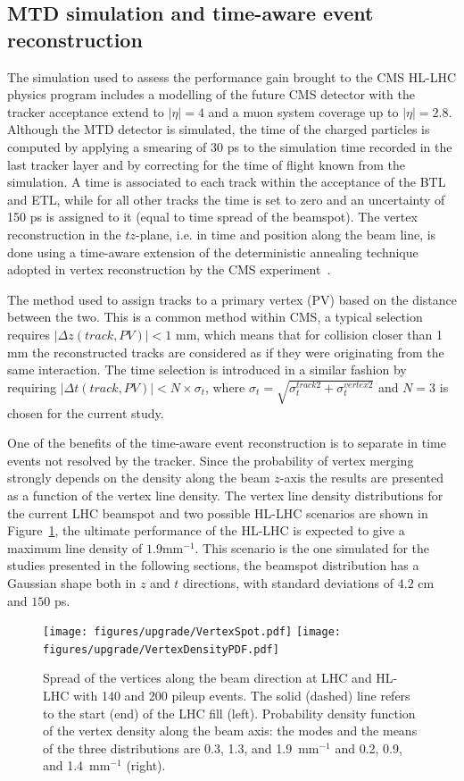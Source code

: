 \subsection{MTD simulation and time-aware event reconstruction}
The simulation used to assess the performance gain brought to the CMS HL-LHC physics program
includes a modelling of the future CMS detector with the tracker acceptance extend to $|\eta|=4$ and
a muon system coverage up to $|\eta|=2.8$. 
Although the MTD detector is simulated, the time of the charged particles
is computed by applying a smearing of 30 ps to the simulation time recorded in the last tracker layer and by
correcting for the time of flight known from the simulation. A time is associated to each track within the acceptance of the BTL
and ETL, while for all other tracks the time is set to zero and an uncertainty of 150 ps is assigned to it (equal to time
spread of the beamspot).
The vertex reconstruction in the $tz$-plane, i.e. in time and position along the
beam line, is done using a time-aware extension of the deterministic
annealing technique adopted in vertex reconstruction by the CMS experiment~\cite{Chatrchyan:2014fea}.

The method used to assign tracks to a primary vertex (PV) based on the distance between the two. This is a common
method within CMS, a typical selection 
requires $|\Delta z(track, PV)| < 1$ mm, which means that for collision closer than 1 mm the reconstructed tracks are
considered as if they were originating from the same interaction. The time selection is introduced in a similar
fashion by requiring $|\Delta t(track, PV)| < N\times\sigma_t$, where $\sigma_t = \sqrt{\sigma_t^{track 2}+\sigma_t^{vertex 2}}$
and $N=3$ is chosen for the current study.

One of the benefits of the time-aware event reconstruction is to separate in time events not resolved by
the tracker. Since the probability of vertex merging strongly depends on the density along the beam $z$-axis the
results are presented as a function of the vertex line density.
The vertex line density distributions for the current LHC beamspot and
two possible HL-LHC scenarios are shown in Figure~\ref{fig:vtx_density}, the ultimate
performance of the HL-LHC is expected to give a maximum line density of $1.9$mm$^{-1}$. This scenario is the one simulated
for the studies presented in the following sections, the beamspot distribution
has a Gaussian shape both in $z$ and $t$ directions, with standard deviations of $4.2$ cm and $150$ ps.

\begin{figure}
  \centering
  \texttt{[image: figures/upgrade/VertexSpot.pdf]}
  \texttt{[image: figures/upgrade/VertexDensityPDF.pdf]}
  \caption{Spread of the vertices along the beam direction at LHC and HL-LHC with 140 and 200 pileup events. 
    The solid (dashed) line refers to the start (end) of the LHC fill (left).
    Probability density function of the vertex density along the beam axis:
    the modes and the means of the three distributions are 0.3, 1.3, and 1.9~mm$^{-1}$ and 0.2, 0.9, and 1.4~mm$^{-1}$ (right).} 
  \label{fig:vtx_density}
\end{figure}

